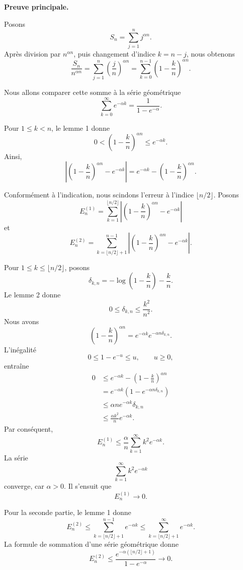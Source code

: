 \documentclass[11pt,a4paper]{article}
\begin{document}
\begin{preuvebox}
\textbf{Preuve principale.}

Posons
\[
S_n=\sum_{j=1}^{n}j^{\alpha n}.
\]
Apr\`es division par \(n^{\alpha n}\), puis changement d'indice
\(k=n-j\), nous obtenons
\[
\frac{S_n}{n^{\alpha n}}
=
\sum_{j=1}^{n}\left(\frac{j}{n}\right)^{\alpha n}
=
\sum_{k=0}^{n-1}
\left(1-\frac{k}{n}\right)^{\alpha n}.
\]

Nous allons comparer cette somme \`a la s\'erie g\'eom\'etrique
\[
\sum_{k=0}^{\infty}e^{-\alpha k}
=
\frac{1}{1-e^{-\alpha}}.
\]

Pour \(1\leq k<n\), le lemme 1 donne
\[
0<
\left(1-\frac{k}{n}\right)^{\alpha n}
\leq e^{-\alpha k}.
\]
Ainsi,
\[
\left|
\left(1-\frac{k}{n}\right)^{\alpha n}
-e^{-\alpha k}
\right|
=
e^{-\alpha k}
-\left(1-\frac{k}{n}\right)^{\alpha n}.
\]

Conform\'ement \`a l'indication, nous scindons l'erreur \`a
l'indice \(\lfloor n/2\rfloor\). Posons
\[
E_n^{(1)}
=
\sum_{k=1}^{\lfloor n/2\rfloor}
\left|
\left(1-\frac{k}{n}\right)^{\alpha n}
-e^{-\alpha k}
\right|
\]
et
\[
E_n^{(2)}
=
\sum_{k=\lfloor n/2\rfloor+1}^{n-1}
\left|
\left(1-\frac{k}{n}\right)^{\alpha n}
-e^{-\alpha k}
\right|.
\]

Pour \(1\leq k\leq\lfloor n/2\rfloor\), posons
\[
\delta_{k,n}
=
-\log\left(1-\frac{k}{n}\right)-\frac{k}{n}.
\]
Le lemme 2 donne
\[
0\leq\delta_{k,n}\leq\frac{k^2}{n^2}.
\]
Nous avons
\[
\left(1-\frac{k}{n}\right)^{\alpha n}
=
e^{-\alpha k}e^{-\alpha n\delta_{k,n}}.
\]
L'in\'egalit\'e
\[
0\leq1-e^{-u}\leq u,
\qquad u\geq0,
\]
entra\^{i}ne
\[
\begin{aligned}
0
&\leq
e^{-\alpha k}
-\left(1-\frac{k}{n}\right)^{\alpha n}\\
&=
e^{-\alpha k}
\left(1-e^{-\alpha n\delta_{k,n}}\right)\\
&\leq
\alpha n e^{-\alpha k}\delta_{k,n}\\
&\leq
\frac{\alpha k^2}{n}e^{-\alpha k}.
\end{aligned}
\]
Par cons\'equent,
\[
E_n^{(1)}
\leq
\frac{\alpha}{n}
\sum_{k=1}^{\infty}k^2e^{-\alpha k}.
\]
La s\'erie
\[
\sum_{k=1}^{\infty}k^2e^{-\alpha k}
\]
converge, car \(\alpha>0\). Il s'ensuit que
\[
E_n^{(1)}\longrightarrow0.
\]

Pour la seconde partie, le lemme 1 donne
\[
E_n^{(2)}
\leq
\sum_{k=\lfloor n/2\rfloor+1}^{n-1}e^{-\alpha k}
\leq
\sum_{k=\lfloor n/2\rfloor+1}^{\infty}e^{-\alpha k}.
\]
La formule de sommation d'une s\'erie g\'eom\'etrique donne
\[
E_n^{(2)}
\leq
\frac{
 e^{-\alpha(\lfloor n/2\rfloor+1)}
}{
 1-e^{-\alpha}
}
\longrightarrow0.
\]


\end{preuvebox}
\end{document}
